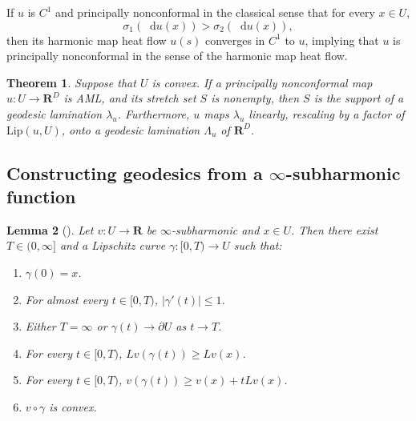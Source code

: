 \documentclass[reqno,11pt]{amsart}
\newcommand{\RR}{\mathbf{R}}
\newcommand*\dif{\mathop{}\!\mathrm{d}}
\newcommand{\Lip}{\mathrm{Lip}}
\newtheorem{theorem}{Theorem}[section]
\newtheorem{lemma}[theorem]{Lemma}
\theoremstyle{definition}
\numberwithin{equation}{section}
\begin{document}
If $u$ is $C^1$ and principally nonconformal in the classical sense that for every $x \in U$,
$$\sigma_1(\dif u(x)) > \sigma_2(\dif u(x)),$$
then its harmonic map heat flow $u(s)$ converges in $C^1$ to $u$, implying that $u$ is principally nonconformal in the sense of the harmonic map heat flow.

\begin{theorem}
Suppose that $U$ is convex.
If a principally nonconformal map $u: U \to \RR^D$ is AML, and its stretch set $S$ is nonempty, then $S$ is the support of a geodesic lamination $\lambda_u$.
Furthermore, $u$ maps $\lambda_u$ linearly, rescaling by a factor of $\Lip(u, U)$, onto a geodesic lamination $\Lambda_u$ of $\RR^D$.
\end{theorem}

\subsection{Constructing geodesics from a \texorpdfstring{$\infty$-subharmonic}{infinity-subharmonic} function}
\begin{lemma}[{\cite[Proposition 6.2]{Crandall2008}}]\label{infinity subharmonic gradient flow}
Let $v: U \to \RR$ be $\infty$-subharmonic and $x \in U$.
Then there exist $T \in (0, \infty]$ and a Lipschitz curve $\gamma: [0, T) \to U$ such that:
\begin{enumerate}
\item $\gamma(0) = x$.
\item For almost every $t \in [0, T)$, $|\gamma'(t)| \leq 1$.
\item Either $T = \infty$ or $\gamma(t) \to \partial U$ as $t \to T$.
\item For every $t \in [0, T)$, $Lv(\gamma(t)) \geq Lv(x)$.
\item For every $t \in [0, T)$, $v(\gamma(t)) \geq v(x) + tLv(x)$.
\item $v \circ \gamma$ is convex.
\end{enumerate}
\end{lemma}
\end{document}
